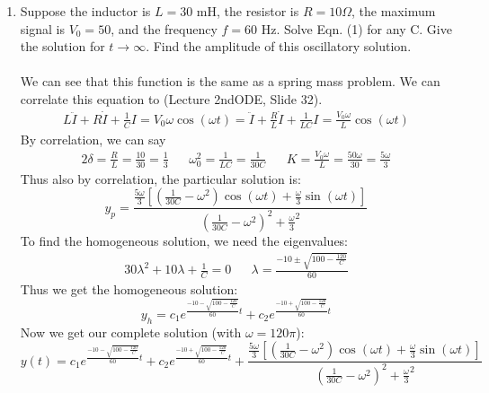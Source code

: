 \documentclass[12pt]{article}
\begin{document}
	\begin{enumerate}[label = (\alph*)]
		\item  Suppose the inductor is $L = 30$ mH, the resistor is $R = 10 \Omega$, the maximum signal is $V_0 = 50$, and the frequency $f = 60$ Hz. Solve Eqn. (1) for any C. Give the solution for $t \rightarrow \infty$. Find the amplitude of this oscillatory solution.
		\\ \\
		We can see that this function is the same as a spring mass problem.  We can correlate this equation to (Lecture 2ndODE, Slide 32).
			\begin{align*}
				L\ddot{I} + R\dot{I} + \frac{1}{C}I = V_0\omega \cos(\omega t) = \ddot{I} + \frac{R}{L}\dot{I} + \frac{1}{LC}I = \frac{V_0\omega}{L} \cos(\omega t)
			\end{align*}
		By correlation, we can say
			\begin{align*}
				2\delta = \frac{R}{L} = \frac{10}{30} = \frac{1}{3} && \omega_0^2 = \frac{1}{LC} = \frac{1}{30C} && K = \frac{V_0\omega}{L} = \frac{50\omega}{30} = \frac{5\omega}{3}
			\end{align*}
		Thus also by correlation, the particular solution is:
			$$
			y_p = \frac{\frac{5\omega}{3}\left[ (\frac{1}{30C} - \omega^2)\cos(\omega t) + \frac{\omega}{3}\sin(\omega t)\right]}{(\frac{1}{30C} - \omega^2)^2 + \frac{\omega}{3}^2}
			$$
		To find the homogeneous solution, we need the eigenvalues:
			\begin{align*}
				30\lambda^2 + 10\lambda + \frac{1}{C} = 0 && \lambda = \frac{-10 \pm \sqrt{100 - \frac{120}{C}}}{60}
			\end{align*}
		Thus we get the homogeneous solution:
			$$
			y_h = c_1e^{\frac{-10 - \sqrt{100 - \frac{120}{C}}}{60}t} + c_2e^{\frac{-10 + \sqrt{100 - \frac{120}{C}}}{60}t}
			$$
		Now we get our complete solution (with $\omega = 120\pi$):
			$$
			y(t) = c_1e^{\frac{-10 - \sqrt{100 - \frac{120}{C}}}{60}t} + c_2e^{\frac{-10 + \sqrt{100 - \frac{120}{C}}}{60}t} + \frac{\frac{5\omega}{3}\left[ (\frac{1}{30C} - \omega^2)\cos(\omega t) + \frac{\omega}{3}\sin(\omega t)\right]}{(\frac{1}{30C} - \omega^2)^2 + \frac{\omega}{3}^2}
			$$
		
		\newpage 
		

\end{enumerate}
\end{document}
